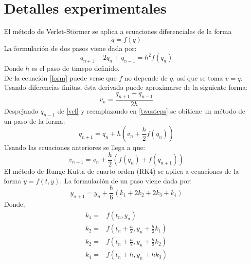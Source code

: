 \documentclass[10pt,twocolumn]{article}
\begin{document}
\section{Detalles experimentales}
El método de Verlet-Störmer se aplica a ecuaciones diferenciales de la forma 
\begin{equation}\label{form}
\ddot{q}=f(q)
\end{equation}
La formulación de dos pasos viene dada por: \\
\begin{equation}\label{twosteps}
q_{n+1}-2q_{n}+q_{n-1}=h^{2}f(q_n)
\end{equation}
Donde $h$ es el paso de timepo definido.\\
De la ecuación \eqref{form} puede verse que $f$ no depende de $\dot{q}$, así que se toma $v=\dot{q}$. Usando diferencias finitas, ésta derivada puede aproximarse de la siguiente forma:
\begin{equation}\label{vel}
v_n=\frac{q_{n+1}-q_{n-1}}{2h}
\end{equation}
Despejando $q_{n-1}$ de \eqref{vel} y reemplazando en \eqref{twosteps} se obitiene un método de un paso de la forma:
\begin{equation}\label{onestep}
q_{n+1}=q_n+h(v_n+\frac{h}{2}f(q_n))
\end{equation}
Usando las ecuaciones anteriores se llega a que:
\begin{equation}
v_{n+1}=v_n+\frac{h}{2}(f(q_n)+f(q_{n+1}))
\end{equation}
El método de Runge-Kutta de cuarto orden (RK4) se aplica a ecuaciones de la forma $\dot{y}=f(t,y)$. La formulación de un paso viene dada por:
\begin{equation}\label{RK4}
y_{n+1}=y_n+\frac{h}{6}(k_1+2k_2+2k_3+k_4)
\end{equation}
Donde,
\begin{equation}\label{kvalues}
\begin{split}
k_1=&f(t_n,y_n)\\
k_2=&f(t_n+\frac{h}{2},y_n+\frac{h}{2}k_1)\\
k_2=&f(t_n+\frac{h}{2},y_n+\frac{h}{2}k_2)\\
k_4=&f(t_n+h,y_n+hk_3)
\end{split}
\end{equation}
\end{document}
